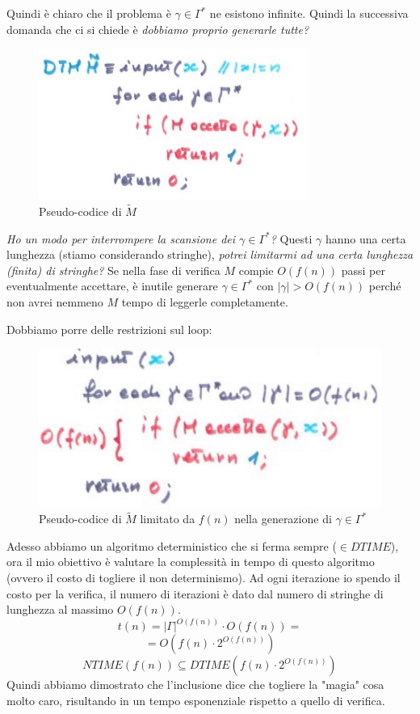 \documentclass{article}
\begin{document}
Quindi è chiaro che il problema è $\gamma\in\Gamma^*$ ne esistono infinite. Quindi la
successiva domanda che ci si chiede è \textit{dobbiamo proprio generarle tutte?}

\begin{figure}[H]
    \centering
    \includegraphics[scale=0.6]{images/pseudtoDTM_tilde.png}
    \caption{Pseudo-codice di $\tilde{M}$}
\end{figure}
\textit{Ho un modo per interrompere la scansione dei $\gamma\in\Gamma^*$?} Questi $\gamma$
hanno una certa lunghezza (stiamo considerando stringhe), \textit{potrei limitarmi ad
    una certa lunghezza (finita) di stringhe?} Se nella fase di verifica $M$ compie $O(f(n))$
passi per eventualmente accettare, è inutile generare $\gamma\in\Gamma^*$ con $|\gamma|>O(f(n))$
perché non avrei nemmeno $M$ tempo di leggerle completamente.

Dobbiamo porre delle restrizioni sul loop:

\begin{figure}[H]
    \centering
    \includegraphics[scale=0.6]{images/pseudtoDTM_tilde_corretto.png}
    \caption{Pseudo-codice di $\tilde{M}$ limitato da $f(n)$ nella generazione di $\gamma\in\Gamma^*$}
\end{figure}
Adesso abbiamo un algoritmo deterministico che si ferma sempre ($\in DTIME$), ora il mio
obiettivo è valutare la complessità in tempo di questo algoritmo (ovvero il costo
di togliere il non determinismo). Ad ogni iterazione io spendo il costo per la verifica,
il numero di iterazioni è dato dal numero di stringhe di lunghezza al massimo $O\left(f(n)\right)$.
$$t(n)=|\Gamma|^{O(f(n))}\cdot O\left(f(n)\right)=$$
$$=O\left(f(n)\cdot 2^{O\left(f(n)\right)}\right)$$
$$NTIME \left(f(n)\right)\subseteq DTIME\left(f(n)\cdot 2^{O(f(n))}\right)$$
Quindi abbiamo dimostrato che l'inclusione dice che togliere la "magia" cosa molto caro,
risultando in un tempo esponenziale rispetto a quello di verifica.
\end{document}
